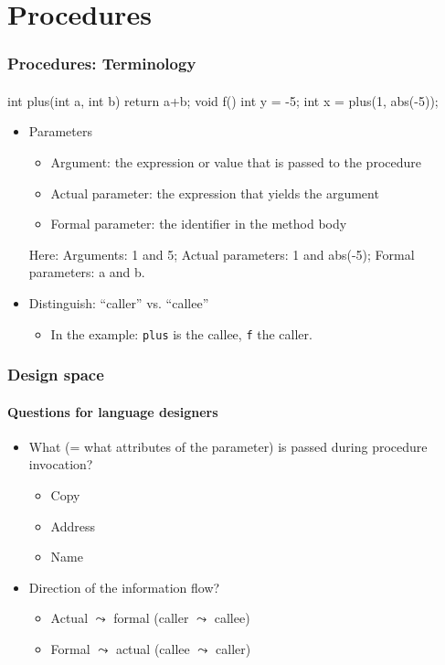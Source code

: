 \documentclass{beamer}
\begin{document}
\section{Procedures}
\begin{frame}[fragile]
\frametitle{Procedures: Terminology}
\framesubtitle{}

\begin{center}
\begin{cplus3}
int plus(int a, int b) {
   return a+b;
}
void f()  {
   int y = -5;
   int x = plus(1, abs(-5));
}
\end{cplus3}
\end{center}

\pause

\begin{itemize}

\item Parameters
\begin{itemize}
\item Argument: the expression or value that is passed to the procedure
\item Actual parameter: the expression that yields the argument 
\item Formal parameter: the identifier in the method body\\
\onslide<+->
\end{itemize}
Here: Arguments: 1 and 5; Actual parameters: 1 and abs(-5); Formal
parameters: a and b. 
\item<+-> Distinguish: ``caller'' vs. ``callee''
\begin{itemize}
\item  In the example: \texttt{plus} is the callee, 
\texttt{f} the caller.
\end{itemize}
\end{itemize}
\end{frame}


\begin{frame}[fragile]
\frametitle{Design space}
\framesubtitle{Questions for language designers}
\begin{itemize}
\item What (= what attributes of the parameter) is passed during
procedure invocation? 

\begin{itemize}
\item Copy
\item Address
\item Name 
\end{itemize}
\item Direction of the information flow?
\begin{itemize}
\item Actual $\leadsto$ formal (caller $\leadsto$ callee)
\item Formal $\leadsto$ actual (callee $\leadsto$ caller)
\end{itemize}
\end{itemize}
\end{frame}
\end{document}
